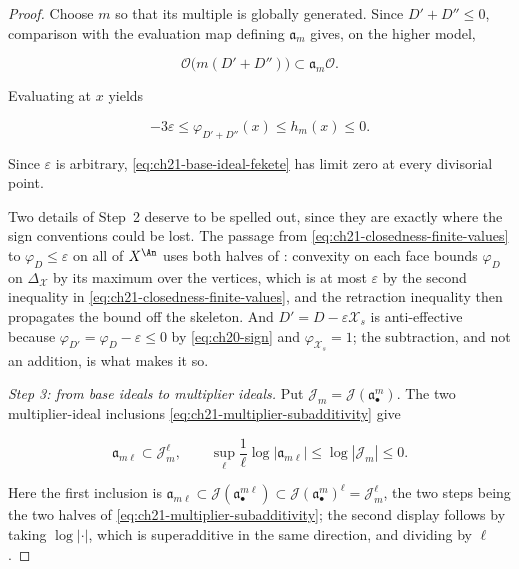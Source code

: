 \begin{proof}
Choose \(m\) so that its multiple is globally generated.  Since
\(D'+D''\leq0\), comparison with the evaluation map defining
\(\mathfrak a_m\) gives, on the higher model,

\[
       \mathcal O\bigl(m(D'+D'')\bigr)
       \subset \mathfrak a_m\mathcal O.
\]

Evaluating at \(x\) yields

\begin{equation}
\label{eq:ch21-closedness-base-bound}
             -3\varepsilon
             \leq\varphi_{D'+D''}(x)
             \leq h_m(x)\leq0.
\end{equation}

Since \(\varepsilon\) is arbitrary,
\eqref{eq:ch21-base-ideal-fekete} has limit zero at every divisorial point.

Two details of Step~2 deserve to be spelled out, since they are exactly
where the sign conventions could be lost.  The passage from
\eqref{eq:ch21-closedness-finite-values} to \(\varphi_D\leq\varepsilon\)
on all of \(X^{\An}\) uses both halves of
: convexity on each face bounds
\(\varphi_D\) on \(\Delta_{\mathcal X}\) by its maximum over the vertices,
which is at most \(\varepsilon\) by the second inequality in
\eqref{eq:ch21-closedness-finite-values}, and the retraction inequality then
propagates the bound off the skeleton.  And \(D'=D-\varepsilon\mathcal X_s\)
is anti-effective because \(\varphi_{D'}=\varphi_D-\varepsilon\leq0\) by
\eqref{eq:ch20-sign} and \(\varphi_{\mathcal X_s}=1\); the subtraction, and
not an addition, is what makes it so.

\emph{Step 3: from base ideals to multiplier ideals.}
Put \(\mathcal J_m=\mathcal J(\mathfrak a_\bullet^m)\).  The two
multiplier-ideal inclusions
\eqref{eq:ch21-multiplier-subadditivity} give

\begin{equation}
\label{eq:ch21-closedness-multiplier-bound}
       \mathfrak a_{m\ell}\subset\mathcal J_m^\ell,
       \qquad
       \sup_{\ell}\frac1\ell\log|\mathfrak a_{m\ell}|
       \leq\log|\mathcal J_m|\leq0.
\end{equation}

Here the first inclusion is
\(\mathfrak a_{m\ell}\subset\mathcal J(\mathfrak a_\bullet^{m\ell})\subset
\mathcal J(\mathfrak a_\bullet^{m})^{\ell}=\mathcal J_m^\ell\), the two
steps being the two halves of
\eqref{eq:ch21-multiplier-subadditivity}; the second display follows by
taking \(\log|\cdot|\), which is superadditive in the same direction, and
dividing by \(\ell\).


\end{proof}
